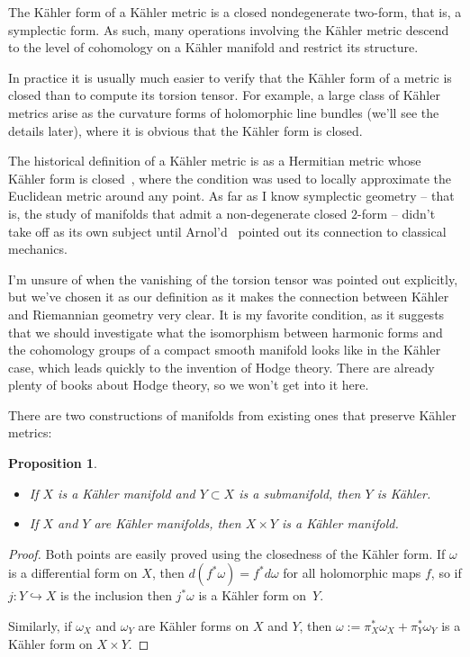 \documentclass[10pt,a4paper]{article}
\newtheorem{prop}[theo]{Proposition}
\newtheorem*{proof}{Proof}
\begin{document}
The K\"ahler form of a K\"ahler metric is a closed nondegenerate two-form, that is, a symplectic form. As such, many operations involving the K\"ahler metric descend to the level of cohomology on a K\"ahler manifold and restrict its structure.

In practice it is usually much easier to verify that the K\"ahler form of a metric is closed than to compute its torsion tensor. For example, a large class of K\"ahler metrics arise as the curvature forms of holomorphic line bundles (we'll see the details later), where it is obvious that the K\"ahler form is closed.

The historical definition of a K\"ahler metric is as a Hermitian metric whose K\"ahler form is closed~\cite{kahler}, where the condition was used to locally approximate the Euclidean metric around any point. As far as I know symplectic geometry -- that is, the study of manifolds that admit a non-degenerate closed $2$-form -- didn't take off as its own subject until Arnol'd~\cite{arnold} pointed out its connection to classical mechanics.

I'm unsure of when the vanishing of the torsion tensor was pointed out explicitly, but we've chosen it as our definition as it makes the connection between K\"ahler and Riemannian geometry very clear. It is my favorite condition, as it suggests that we should investigate what the isomorphism between harmonic forms and the cohomology groups of a compact smooth manifold looks like in the K\"ahler case, which leads quickly to the invention of Hodge theory. There are already plenty of books about Hodge theory, so we won't get into it here.


There are two constructions of manifolds from existing ones that preserve K\"ahler metrics:

\begin{prop}
  \begin{itemize}
  \item If $X$ is a K\"ahler manifold and $Y \subset X$ is a submanifold, then $Y$ is K\"ahler.
  \item If $X$ and $Y$ are K\"ahler manifolds, then $X \times Y$ is a K\"ahler manifold.
  \end{itemize}
\end{prop}

\begin{proof}
  Both points are easily proved using the closedness of the K\"ahler form. If $\omega$ is a differential form on $X$, then $d(f^*\omega) = f^*d\omega$ for all holomorphic maps $f$, so if $j : Y \hookrightarrow X$ is the inclusion then $j^*\omega$ is a K\"ahler form on~$Y$.%

Similarly, if $\omega_X$ and $\omega_Y$ are K\"ahler forms on $X$ and $Y$, then $\omega := \pi_X^*\omega_X + \pi_Y^*\omega_Y$ is a K\"ahler form on $X \times Y$.
\end{proof}
\end{document}
